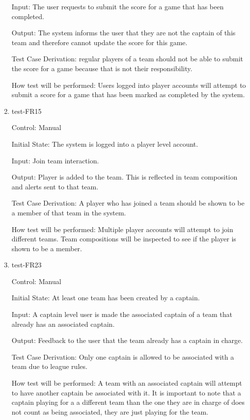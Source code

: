 \documentclass[12pt, titlepage]{article}
\begin{document}
\begin{enumerate}
  Input: The user requests to submit the score for a game that has
  been completed.
           
  Output: The system informs the user that they are not the captain 
  of this team and therefore cannot update the score for this game.
 
  Test Case Derivation: regular players of a team should not be able to 
  submit the score for a game because that is not their responsibility.
 
  How test will be performed: Users logged into player accounts will 
  attempt to submit a score for a game that has been marked as completed 
  by the system.

  \item{test-FR15\\}

  Control: Manual

  Initial State: The system is logged into a player level account.
            
  Input: Join team interaction.
            
  Output: Player is added to the team. This is reflected in team composition
  and alerts sent to that team.

  Test Case Derivation: A player who has joined a team should be shown to be a
  member of that team in the system.

  How test will be performed: Multiple player accounts will attempt to join 
  different teams. Team compositions will be inspected to see if the player
  is shown to be a member. 

  \item{test-FR23\\}

  Control: Manual
            
  Initial State: At least one team has been created by a captain.

  Input: A captain level user is made the associated captain of a team that
  already has an associated captain.

  Output: Feedback to the user that the team already has a captain in charge.

  Test Case Derivation: Only one captain is allowed to be associated with a
  team due to league rules.

  How test will be performed: A team with an associated captain will attempt
  to have another captain be associated with it. It is important to note that
  a captain playing for a a different team than the one they are in charge of
  does not count as being associated, they are just playing for the team.

\end{enumerate}
\end{document}
